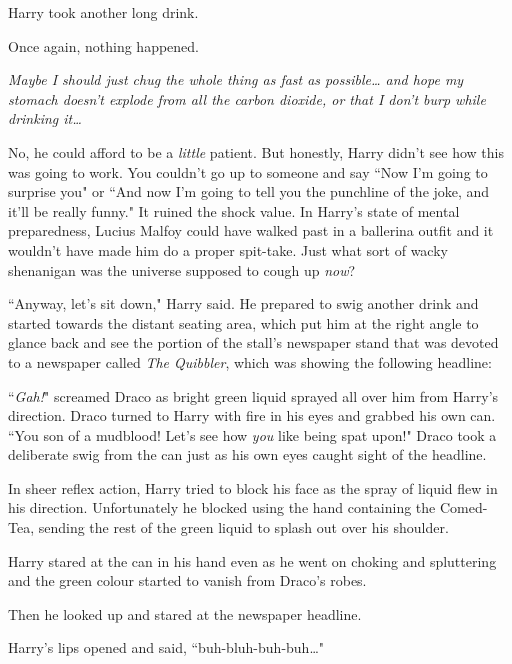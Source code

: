 Harry took another long drink.

Once again, nothing happened.

\emph{Maybe I should just chug the whole thing as fast as possible{\ldots} and hope my stomach doesn't explode from all the carbon dioxide, or that I don't burp while drinking it{\ldots}}

No, he could afford to be a \emph{little} patient. But honestly, Harry didn't see how this was going to work. You couldn't go up to someone and say ``Now I'm going to surprise you" or ``And now I'm going to tell you the punchline of the joke, and it'll be really funny." It ruined the shock value. In Harry's state of mental preparedness, Lucius Malfoy could have walked past in a ballerina outfit and it wouldn't have made him do a proper spit-take. Just what sort of wacky shenanigan was the universe supposed to cough up \emph{now}?

``Anyway, let's sit down," Harry said. He prepared to swig another drink and started towards the distant seating area, which put him at the right angle to glance back and see the portion of the stall's newspaper stand that was devoted to a newspaper called \emph{The Quibbler}, which was showing the following headline:


``\emph{Gah!}" screamed Draco as bright green liquid sprayed all over him from Harry's direction. Draco turned to Harry with fire in his eyes and grabbed his own can. ``You son of a mudblood! Let's see how \emph{you} like being spat upon!" Draco took a deliberate swig from the can just as his own eyes caught sight of the headline.

In sheer reflex action, Harry tried to block his face as the spray of liquid flew in his direction. Unfortunately he blocked using the hand containing the Comed-Tea, sending the rest of the green liquid to splash out over his shoulder.

Harry stared at the can in his hand even as he went on choking and spluttering and the green colour started to vanish from Draco's robes.

Then he looked up and stared at the newspaper headline.


Harry's lips opened and said, ``buh-bluh-buh-buh{\ldots}"

